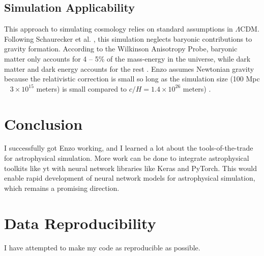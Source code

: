 \subsection*{Simulation Applicability}

This approach to simulating cosmology relies on standard assumptions in \(\Lambda\)CDM. Following Schaurecker et al. \cite{schaurecker_super-resolving_2021}, this simulation neglects baryonic contributions to gravity formation. According to the Wilkinson Anisotropy Probe, baryonic matter only accounts for 4 -- 5\% of the mass-energy in the universe, while dark matter and dark energy accounts for the rest \cite{hinshaw_nine-year_2013}. Enzo assumes Newtonian gravity because the relativistic correction is small so long as the simulation size (100 Mpc ~ \(3 \times 10^{15}\) meters) is small compared to \(c / H = 1.4 \times 10^{26}\) meters) \cite{bryan_enzo_2014}.

\section*{Conclusion}

I successfully got Enzo working, and I learned a lot about the tools-of-the-trade for astrophysical simulation. More work can be done to integrate astrophysical toolkits like yt with neural network libraries like Keras and PyTorch. This would enable rapid development of neural network models for astrophysical simulation, which remains a promising direction.

\section*{Data Reproducibility}

I have attempted to make my code as reproducible as possible.

